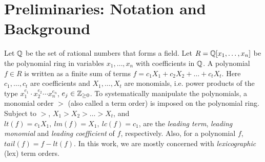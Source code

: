\section{Preliminaries: Notation and Background}
\label{sec:prelim}

Let ${\mathbb{Q}}$ be the set of rational numbers that forms a field. Let $R={\mathbb{Q}}[x_1,\dots,x_n]$ be the  polynomial ring in variables
$x_1,\dots,x_n$ with coefficients in ${\mathbb{Q}}$. A polynomial $f \in R$ is 
written as a finite sum of terms  $f = c_1 X_1 +  c_2 X_2 + \dots +
c_t X_t$.  Here $c_1, \dots, c_t$ are coefficients and $X_1, \dots,
X_t$ are monomials, i.e. power products of the type $x_1^{e_{1}}\cdot
x_2^{e_{2}}\cdots x_n^{e_{n}}$,  $e_j \in {\mathbb{Z}}_{\geq  0}$. To
systematically manipulate the polynomials, a monomial order $>$ (also
called a term order) is imposed on the polynomial ring.
Subject to $>$, $X_1 >X_2 > \dots >  X_t$, and 
$lt(f) = c_1 X_1, ~lm(f) = X_1, ~lc(f) = c_1$, are the {\it
leading   term}, {\it   leading monomial} and {\it   leading
coefficient} of $f$, respectively. Also, for a polynomial $f$,
$tail(f) = f - lt(f)$. In this work, we are mostly concerned with {\it lexicographic} (lex) term orders. 




